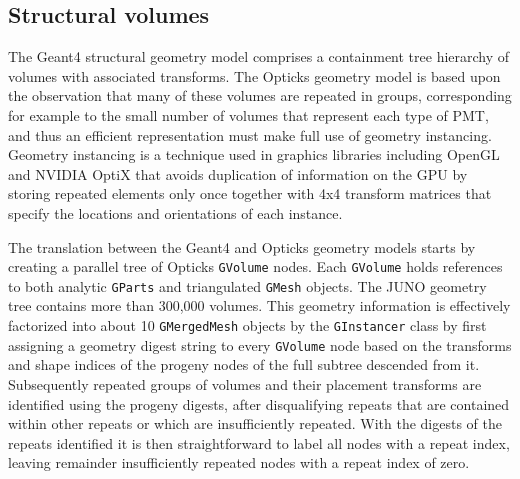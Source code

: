 \documentclass{webofc}
\begin{document}
%
%
%
\subsection{Structural volumes}%
%
The Geant4 structural geometry model comprises a containment tree hierarchy of volumes with associated transforms.
The Opticks geometry model is based upon the observation that many of these volumes are 
repeated in groups, corresponding for example to the small number of volumes that represent each type of PMT, 
and thus an efficient representation must make full use of geometry instancing. 
Geometry instancing is a technique used in graphics libraries including OpenGL and NVIDIA OptiX that 
avoids duplication of information on the GPU by storing repeated elements only once together 
with 4x4 transform matrices that specify the locations and orientations of each instance.

The translation between the Geant4 and Opticks geometry models starts by creating 
a parallel tree of Opticks {\tt GVolume} nodes. Each {\tt GVolume} holds references to both 
analytic {\tt GParts} and triangulated {\tt GMesh} objects.
The JUNO geometry tree contains more than 300,000 volumes.  This geometry information 
is effectively factorized into about 10 {\tt GMergedMesh} objects by the {\tt GInstancer} class
by first assigning a geometry digest string to every {\tt GVolume} node based on the transforms and shape 
indices of the progeny nodes of the full subtree descended from it. 
Subsequently repeated groups of volumes and their placement transforms are identified using the progeny digests, 
after disqualifying repeats that are contained within other repeats or which are insufficiently repeated.
With the digests of the repeats identified it is then straightforward to label all nodes with a repeat index,
leaving remainder insufficiently repeated nodes with a repeat index of zero.
\end{document}
